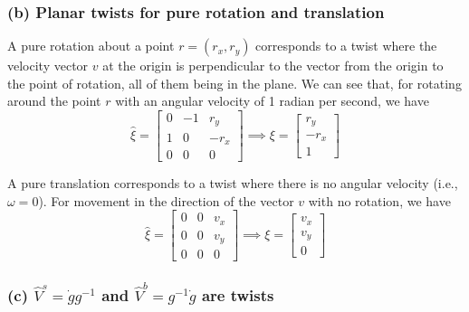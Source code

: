 \subsubsection*{(b) Planar twists for pure rotation and translation}

A pure rotation about a point \( r = (r_x, r_y) \) corresponds to a twist where the velocity vector \( v \) at the origin is perpendicular to the vector from the origin to the point of rotation, all of them being in the plane.
We can see that, for rotating around the point \( r \) with an angular velocity of 1 radian per second, we have
\[
    \hat{\xi} = \begin{bmatrix}
        0 & -1 & r_y  \\
        1 & 0  & -r_x \\
        0 & 0  & 0
    \end{bmatrix}
    \implies
    \xi = \begin{bmatrix}
        r_y  \\
        -r_x \\
        1
    \end{bmatrix}
\]

A pure translation corresponds to a twist where there is no angular velocity (i.e., \( \omega = 0 \)).
For movement in the direction of the vector \( v \) with no rotation, we have
\[
    \hat{\xi} = \begin{bmatrix}
        0 & 0 & v_x \\
        0 & 0 & v_y \\
        0 & 0 & 0
    \end{bmatrix}
    \implies
    \xi = \begin{bmatrix}
        v_x \\
        v_y \\
        0
    \end{bmatrix}
\]

\clearpage
\subsubsection*{(c) \( \hat{V}^{s} = \dot{g} g^{-1} \) and \( \hat{V}^{b} = g^{-1} \dot{g} \) are twists}

